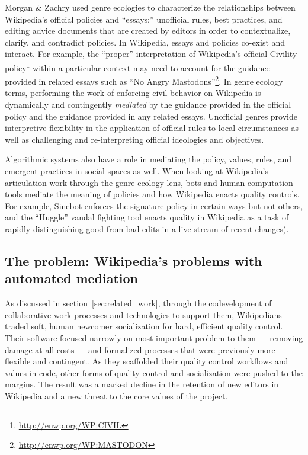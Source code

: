 Morgan \& Zachry used genre ecologies to characterize the relationships between Wikipedia's official policies and ``essays:'' unofficial rules, best practices, and editing advice documents that are created by editors in order to contextualize, clarify, and contradict policies\cite{morgan2010negotiating}. In Wikipedia, essays and policies co-exist and interact. For example, the ``proper'' interpretation of Wikipedia's official Civility policy\footnote{\url{http://enwp.org/WP:CIVIL}} within a particular context may need to account for the guidance provided in related essays such as ``No Angry Mastodons''\footnote{\url{http://enwp.org/WP:MASTODON}}. In genre ecology terms, performing the work of enforcing civil behavior on Wikipedia is dynamically and contingently \emph{mediated} by the guidance provided in the official policy and the guidance provided in any related essays. Unofficial genres provide interpretive flexibility in the application of official rules to local circumstances as well as challenging and re-interpreting official ideologies and objectives.

Algorithmic systems also have a role in mediating the policy, values, rules, and emergent practices in social spaces as well\cite{lessig1999code,suchman2007human,orlikowski2015algorithm}.  When looking at Wikipedia's articulation work through the genre ecology lens, bots and human-computation tools mediate the meaning of policies and how Wikipedia enacts quality controls. For example, Sinebot enforces the signature policy in certain ways but not others\cite{geiger2011lives}, and the ``Huggle'' vandal fighting tool enacts quality in Wikipedia as a task of rapidly distinguishing good from bad edits in a live stream of recent changes\cite{halfaker2014snuggle}).

\subsection{The problem: Wikipedia's problems with automated mediation}
As discussed in section~\ref{sec:related_work}, through the codevelopment of collaborative work processes and technologies to support them, Wikipedians traded soft, human newcomer socialization for hard, efficient quality control. Their software focused narrowly on most important problem to them --- removing damage at all costs --- and formalized processes that were previously more flexible and contingent. As they scaffolded their quality control workflows and values in code, other forms of quality control and socialization were pushed to the margins.  The result was a marked decline in the retention of new editors in Wikipedia and a new threat to the core values of the project.

